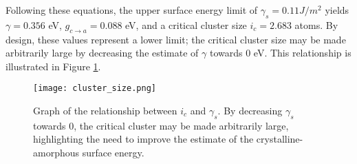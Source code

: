 Following these equations, the upper surface energy limit of $\gamma_s = 0.11 J/m^2$ yields $\gamma = 0.356$ eV, $g_{c \rightarrow a} = 0.088$ eV, and a critical cluster size $i_c = 2.683$ atoms.  By design, these values represent a lower limit; the critical cluster size may be made arbitrarily large by decreasing the estimate of $\gamma$ towards 0 eV.  This relationship is illustrated in Figure \ref{fig:cluster_size}.

	\begin{figure}[h]
		\centering
		\texttt{[image: cluster\_size.png]}
		\caption{Graph of the relationship between $i_c$ and $\gamma_s$.  By decreasing $\gamma_s$ towards 0, the critical cluster may be made arbitrarily large, highlighting the need to improve the estimate of the crystalline-amorphous surface energy.}
		\label{fig:cluster_size}
	\end{figure}
